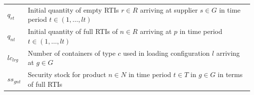 \begin{longtable}[hbt!]{  |p{}|p{}  |}
  $q_{rt}$                                                                                       & Initial quantity of empty RTIs $r\in R$ arriving at supplier $s\in G$ in time period $t \in (1,\dots , lt)$                                                                                                                                                                                                                                                                                                                                                                                                                                                                    \\
  $q_{nt}$                                                                                       & Initial quantity of full RTIs of $n \in R$ arriving at $p$ in time period $t \in (1,\dots , lt)$                                                                                                                                                                                                                                                                                                                                                                                                                                                                               \\
  $lc_{lrg}$                                                                                     & Number of containers of type $c$ used in loading configuration $l$ arriving at $g\in G$                                                                                                                                                                                                                                                                                                                                                                                                                                                                                        \\
  $ss_{gnt}$                                                                                     & Security stock for product $n\in N$  in time period $t \in T$ in $g \in G$ in terms of full RTIs                                                                                                                                                                                                                                                                                                                                                                                                                                                                               \\

\end{longtable}
